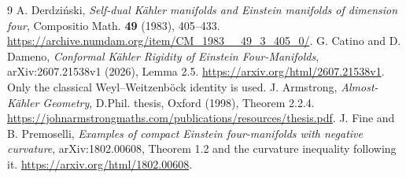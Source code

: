 \documentclass[11pt]{article}
\theoremstyle{remark}\newtheorem{remark}[theorem]{Remark}
\begin{document}
\begin{thebibliography}{9}
A. Derdzi\'nski,
\emph{Self-dual K\"ahler manifolds and Einstein manifolds of dimension four},
Compositio Math. \textbf{49} (1983), 405--433.
\url{https://archive.numdam.org/item/CM_1983__49_3_405_0/}.
G. Catino and D. Dameno,
\emph{Conformal K\"ahler Rigidity of Einstein Four-Manifolds},
arXiv:2607.21538v1 (2026), Lemma 2.5.
\url{https://arxiv.org/html/2607.21538v1}.
Only the classical Weyl--Weitzenb\"ock identity is used.
J. Armstrong, \emph{Almost-K\"ahler Geometry}, D.Phil. thesis, Oxford (1998),
Theorem 2.2.4.
\url{https://johnarmstrongmaths.com/publications/resources/thesis.pdf}.
J. Fine and B. Premoselli,
\emph{Examples of compact Einstein four-manifolds with negative curvature},
arXiv:1802.00608, Theorem 1.2 and the curvature inequality following it.
\url{https://arxiv.org/html/1802.00608}.
\end{thebibliography}
\end{document}
